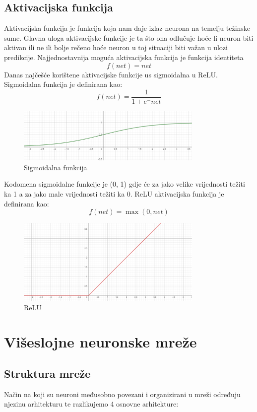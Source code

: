 \subsection{Aktivacijska funkcija}
Aktivacijska funkcija je funkcija koja nam daje izlaz neurona na temelju težinske sume.
Glavna uloga aktivacijske funkcije je ta što ona odlučuje hoće li neuron biti aktivan ili ne ili bolje rečeno hoće neuron u toj situaciji biti
važan u ulozi predikcije.
Najjednostavnija moguća aktivacijska funkcija je funkcija identiteta
\[ f(\textit{net}) = net \]
Danas najčešće korištene aktivacijske funkcije us sigmoidalna u ReLU.
Sigmoidalna funkcija je definirana kao:
\[ f(\textit{net}) = \frac{1}{1 + e^-net} \]
\FloatBarrier
\begin{figure}[h]
    \centering
    \includegraphics[width=0.8\textwidth]{images/Sigmoid}
    \caption{Sigmoidalna funkcija}
    \label{fig:slika2}
\end{figure}
Kodomena sigmoidalne funkcije je (0, 1) gdje će za jako velike vrijednosti težiti ka 1 a za jako male vrijednosti težiti ka 0.
ReLU aktivacijska funkcija je definirana kao:
\[ f(\textit{net}) = \max(0, \textit{net}) \]
\FloatBarrier
\begin{figure}[h]
    \centering
    \includegraphics[width=0.8\textwidth]{images/ReLU}
    \caption{ReLU}
    \label{fig:slika3}
\end{figure}
\FloatBarrier

\section{Višeslojne neuronske mreže}
\subsection{Struktura mreže}
Način na koji su neuroni međusobno povezani i organizirani u mreži određuju njezinu arhitekturu te razlikujemo 4 osnovne arhitekture:

